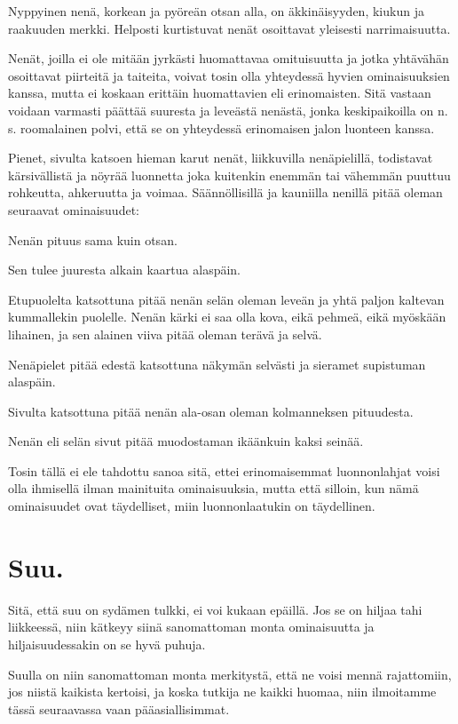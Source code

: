 \documentclass[11pt, twoside, finnish, a5paper]{book}
\begin{document}
Nyppyinen nenä, korkean ja pyöreän otsan alla, on
äkkinäisyyden, kiukun ja raakuuden merkki.
Helposti kurtistuvat nenät osoittavat yleisesti
narrimaisuutta.

Nenät, joilla ei ole mitään jyrkästi huomattavaa omituisuutta
ja jotka yhtävähän osoittavat piirteitä ja taiteita,
voivat tosin olla yhteydessä hyvien ominaisuuksien
kanssa, mutta ei koskaan erittäin huomattavien eli erinomaisten.
Sitä vastaan voidaan varmasti päättää suuresta ja
leveästä nenästä, jonka keskipaikoilla on n. s.
roomalainen polvi, että se on yhteydessä erinomaisen
jalon luonteen kanssa.

Pienet, sivulta katsoen hieman karut nenät, liikkuvilla
nenäpielillä, todistavat kärsivällistä ja nöyrää
luonnetta joka kuitenkin enemmän tai vähemmän puuttuu rohkeutta,
ahkeruutta ja voimaa. Säännöllisillä ja kauniilla nenillä pitää
oleman seuraavat ominaisuudet:

Nenän pituus sama kuin otsan.

Sen tulee juuresta alkain kaartua alaspäin.

Etupuolelta katsottuna pitää nenän selän oleman
leveän ja yhtä paljon kaltevan kummallekin puolelle.
Nenän kärki ei saa olla kova, eikä pehmeä, eikä
myöskään lihainen, ja sen alainen viiva pitää oleman
terävä ja selvä.

Nenäpielet pitää edestä katsottuna näkymän selvästi
ja sieramet supistuman alaspäin.

Sivulta katsottuna pitää nenän ala-osan oleman
kolmanneksen pituudesta.

Nenän eli selän sivut pitää muodostaman ikäänkuin
kaksi seinää.

Tosin tällä ei ele tahdottu sanoa sitä, ettei
erinomaisemmat luonnonlahjat voisi olla ihmisellä ilman
mainituita ominaisuuksia, mutta että silloin, kun nämä
ominaisuudet ovat täydelliset, miin luonnonlaatukin on
täydellinen.

\chapter*{Suu.}

Sitä, että suu on sydämen tulkki, ei voi kukaan epäillä.
Jos se on hiljaa tahi liikkeessä, niin kätkeyy siinä
sanomattoman monta ominaisuutta ja hiljaisuudessakin
on se hyvä puhuja.

Suulla on niin sanomattoman monta merkitystä, että
ne voisi mennä rajattomiin, jos niistä kaikista kertoisi,
ja koska tutkija ne kaikki huomaa, niin
ilmoitamme tässä seuraavassa vaan pääasiallisimmat.
\end{document}
